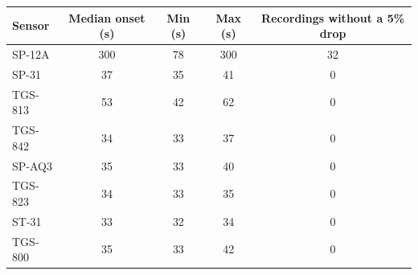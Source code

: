 \begin{tabular}{lcccc}
\toprule
\textbf{Sensor} & \textbf{Median onset (s)} & \textbf{Min (s)} & \textbf{Max (s)} & \textbf{Recordings without a 5\% drop} \\
\midrule
SP-12A & 300 & 78 & 300 & 32 \\
SP-31 & 37 & 35 & 41 & 0 \\
TGS-813 & 53 & 42 & 62 & 0 \\
TGS-842 & 34 & 33 & 37 & 0 \\
SP-AQ3 & 35 & 33 & 40 & 0 \\
TGS-823 & 34 & 33 & 35 & 0 \\
ST-31 & 33 & 32 & 34 & 0 \\
TGS-800 & 35 & 33 & 42 & 0 \\
\bottomrule
\end{tabular}
